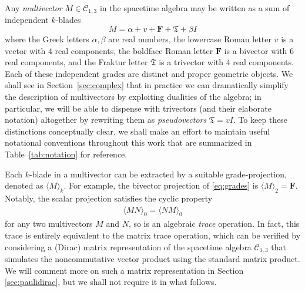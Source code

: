 \documentclass[1p,sort&compress]{elsarticle}
\numberwithin{equation}{section}
\newcommand{\bv}[1]{\mathbf{#1}}
\newcommand{\mean}[1]{\langle #1 \rangle}
\begin{document}
Any \emph{multivector} $M\in\mathcal{C}_{1,3}$ in the spacetime algebra may be written as a sum of independent $k$-blades
\begin{equation}\label{eq:grades}
  M = \alpha + v + \bv{F} + \mathfrak{T} + \beta I
\end{equation}
where the Greek letters $\alpha,\beta$ are real numbers, the lowercase Roman letter $v$ is a vector with $4$ real components, the boldface Roman letter $\bv{F}$ is a bivector with $6$ real components, and the Fraktur letter $\mathfrak{T}$ is a trivector with $4$ real components.  Each of these independent grades are distinct and proper geometric objects.  We shall see in Section~\ref{sec:complex} that in practice we can dramatically simplify the description of multivectors by exploiting dualities of the algebra; in particular, we will be able to dispense with trivectors (and their elaborate notation) altogether by rewriting them as \emph{pseudovectors} $\mathfrak{T} = v I$. To keep these distinctions conceptually clear, we shall make an effort to maintain useful notational conventions throughout this work that are summarized in Table~\ref{tab:notation} for reference. 

Each $k$-blade in a multivector can be extracted by a suitable grade-projection, denoted as $\mean{M}_k$.  For example, the bivector projection of \eqref{eq:grades} is $\mean{M}_2 = \bv{F}$.  Notably, the scalar projection satisfies the cyclic property 
\begin{align}\label{eq:cyclicscalar}
  \mean{MN}_0 = \mean{NM}_0
\end{align}
for any two multivectors $M$ and $N$, so is an algebraic \emph{trace} operation.  In fact, this trace is entirely equivalent to the matrix trace operation, which can be verified by considering a (Dirac) matrix representation of the spacetime algebra $\mathcal{C}_{1,3}$ that simulates the noncommutative vector product using the standard matrix product.  We will comment more on such a matrix representation in Section \ref{sec:paulidirac}, but we shall not require it in what follows.
\end{document}

